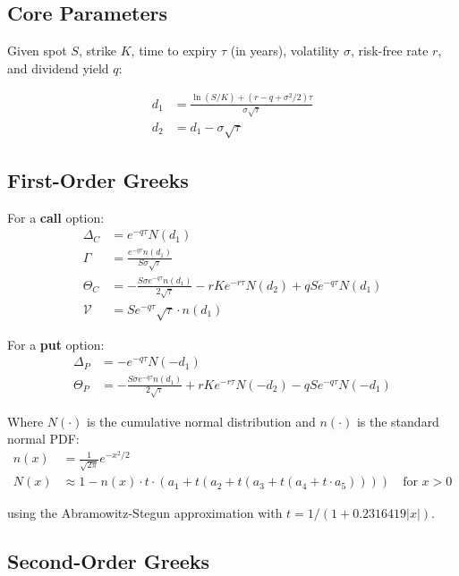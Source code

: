 \documentclass[11pt, a4paper]{article}
\begin{document}
\subsection{Core Parameters}

Given spot $S$, strike $K$, time to expiry $\tau$ (in years), volatility $\sigma$, risk-free rate $r$, and dividend yield $q$:

\begin{align}
d_1 &= \frac{\ln(S/K) + (r - q + \sigma^2/2)\tau}{\sigma\sqrt{\tau}} \\
d_2 &= d_1 - \sigma\sqrt{\tau}
\end{align}

\subsection{First-Order Greeks}

For a \textbf{call} option:
\begin{align}
\Delta_C &= e^{-q\tau} N(d_1) \\
\Gamma &= \frac{e^{-q\tau} n(d_1)}{S \sigma \sqrt{\tau}} \\
\Theta_C &= -\frac{S \sigma e^{-q\tau} n(d_1)}{2\sqrt{\tau}} - rKe^{-r\tau}N(d_2) + qSe^{-q\tau}N(d_1) \\
\mathcal{V} &= S e^{-q\tau} \sqrt{\tau} \cdot n(d_1)
\end{align}

For a \textbf{put} option:
\begin{align}
\Delta_P &= -e^{-q\tau} N(-d_1) \\
\Theta_P &= -\frac{S \sigma e^{-q\tau} n(d_1)}{2\sqrt{\tau}} + rKe^{-r\tau}N(-d_2) - qSe^{-q\tau}N(-d_1)
\end{align}

Where $N(\cdot)$ is the cumulative normal distribution and $n(\cdot)$ is the standard normal PDF:
\begin{align}
n(x) &= \frac{1}{\sqrt{2\pi}} e^{-x^2/2} \\
N(x) &\approx 1 - n(x) \cdot t \cdot (a_1 + t(a_2 + t(a_3 + t(a_4 + t \cdot a_5)))) \quad \text{for } x > 0
\end{align}

using the Abramowitz-Stegun approximation \cite{abramowitz1964handbook} with $t = 1/(1 + 0.2316419|x|)$.

\subsection{Second-Order Greeks}
\end{document}
